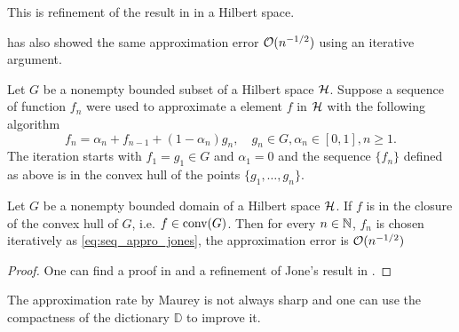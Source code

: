 \begin{remark}
    This is refinement of the result in \cite{pisierRemarquesResultatNon1980} in a
    Hilbert space. 
\end{remark}

\cite{jonesSimpleLemmaGreedy1992} has also showed the same approximation error
$\mathcal{O}(n^{-1/2})$ using an iterative argument. 

Let $G$ be a nonempty bounded subset of a Hilbert space $\mathcal{H}$. Suppose a
sequence of function $f_n$ were used to approximate a element $f$ in $\mathcal{H}$
with the following algorithm
\begin{equation}
    \label{eq:seq_appro_jones}
    f_n = \alpha_n + f_{n-1} + (1-\alpha_n) g_n, \quad
    g_n \in G, \alpha_n \in [0,1], n \geq 1.
\end{equation}
The iteration starts with $f_1 = g_1 \in G$ and $\alpha_1 = 0$ and the sequence
$\{f_n\}$ defined as above is in the convex hull of the points $\{g_1,\dots,
g_n\}$.

\begin{theorem}
    Let $G$ be a nonempty bounded domain of a Hilbert space $\mathcal{H}$. If $f$
    is in the closure of the convex hull of $G$, i.e. $f \in \textnormal{conv}(G)$. Then for
    every $n \in \mathbb{N}$, $f_n$ is chosen iteratively as
    \eqref{eq:seq_appro_jones}, the approximation error is $\mathcal{O}(n^{-1/2})$
\end{theorem}

\begin{proof}
    One can find a proof in \cite{jonesSimpleLemmaGreedy1992} and a refinement
    of Jone's result in \cite[Theorem
    5]{barronUniversalApproximationBounds1993}.    
\end{proof}

\begin{remark}
    The approximation rate by Maurey is not always sharp and one can use the
    compactness of the dictionary $\mathbb{D}$ to improve it.
\end{remark}



